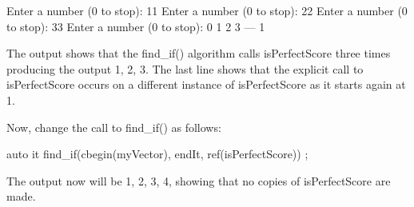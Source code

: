 \begin{shell}
Enter a number (0 to stop): 11
Enter a number (0 to stop): 22
Enter a number (0 to stop): 33
Enter a number (0 to stop): 0
1
2
3
---
1
\end{shell}

The output shows that the find\_if() algorithm calls isPerfectScore three times producing the output 1, 2, 3. The last line shows that the explicit call to isPerfectScore occurs on a different instance of isPerfectScore as it starts again at 1.

Now, change the call to find\_if() as follows:

\begin{cpp}
auto it { find_if(cbegin(myVector), endIt, ref(isPerfectScore)) };
\end{cpp}

The output now will be 1, 2, 3, 4, showing that no copies of isPerfectScore are made.





